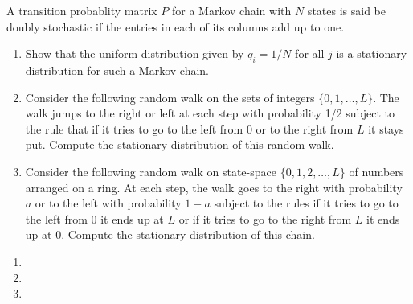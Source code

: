 \begin{problem}
    A transition probablity matrix \( P \) for a Markov chain with \( N \) states is said be doubly stochastic if the entries in each of its columns add up to one.
\begin{enumerate}[nolistsep,label=(\alph*)]
\item Show that the uniform distribution given by \( q_i = 1/N \) for all \( j \) is a stationary distribution for such a Markov chain.
\item Consider the following random walk on the sets of integers \( \{0, 1, \ldots, L\} \). The walk jumps to the right or left at each step with probability 1/2 subject to the rule that if it tries to go to the left from 0 or to the right from \( L \) it stays put. Compute the stationary distribution of this random walk.
\item Consider the following random walk on state-space \( \{0, 1, 2, \ldots, L\} \) of numbers arranged on a ring. At each step, the walk goes to the right with probability \( a \) or to the left with probability \( 1 - a \) subject to the rules if it tries to go to the left from 0 it ends up at \( L \) or if it tries to go to the right from \( L \) it ends up at 0. Compute the stationary distribution of this chain.
\end{enumerate}
\end{problem}

\begin{solution}[Solution]
\begin{enumerate}[label=(\alph*)]
    \item 
    \item 
    \item 
\end{enumerate}
\end{solution}


